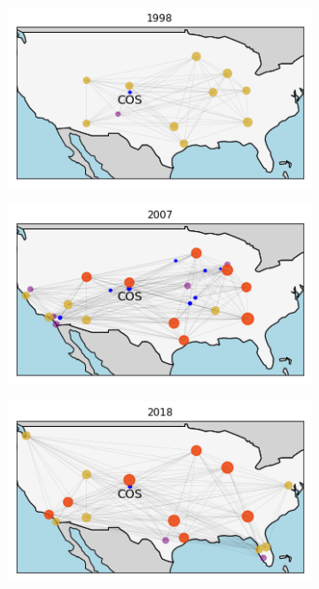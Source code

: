 \begin{figure}[H]
  \centering
  \caption{Network of Colorado Springs (COS) and its direct neighbors}
    \begin{subfigure}[t]{0.32\textwidth}
        \centering
        \includegraphics[width=\linewidth]{Exam/Figures/map_COS_98}
    \end{subfigure}
    \hfill
    \begin{subfigure}[t]{0.32\textwidth}
        \centering
        \includegraphics[width=\linewidth]{Exam/Figures/map_COS_07} 
    \end{subfigure}
    \hfill
    \begin{subfigure}[t]{0.32\textwidth}
        \centering
        \includegraphics[width=\linewidth]{Exam/Figures/map_COS_18} 
    \end{subfigure}
  \label{fig:map_COS}
\end{figure}
